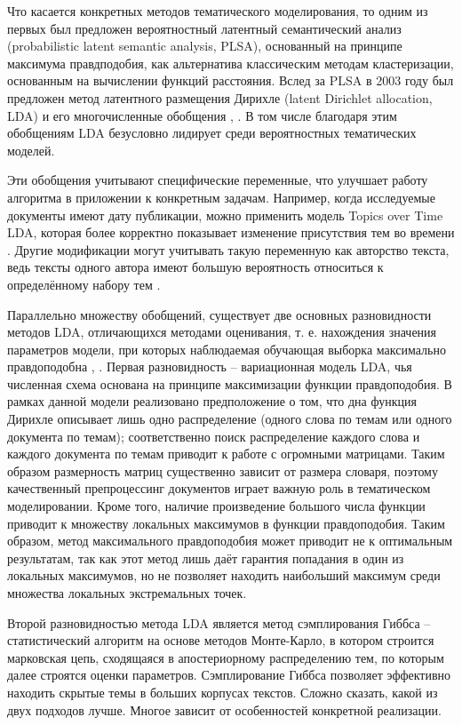 Что касается конкретных методов тематического моделирования, то одним из первых был предложен вероятностный латентный семантический анализ (probabilistic latent semantic analysis, PLSA), основанный на принципе максимума правдподобия, как альтернатива классическим методам кластеризации, основанным на вычислении функций расстояния. Вслед за PLSA в 2003 году был предложен метод латентного размещения Дирихле (latent Dirichlet allocation, LDA) \cite{LDAOrigin} и его многочисленные обобщения \cite{NeedlesInAHaystack}, \cite{LDASurvey}. В том числе благодаря этим обобщениям LDA безусловно лидирует среди вероятностных тематических моделей.

Эти обобщения учитывают специфические переменные, что улучшает работу алгоритма в приложении к конкретным задачам. Например, когда исследуемые документы имеют дату публикации, можно применить модель Topics over Time LDA, которая более корректно показывает изменение присутствия тем во времени \cite{ToTLDA}. Другие модификации могут учитывать такую переменную как авторство текста, ведь тексты одного автора имеют большую вероятность относиться к определённому набору тем \cite{authorLDA}.

Параллельно множеству обобщений, существует две основных разновидности методов LDA, отличающихся методами оценивания, т. е. нахождения значения параметров модели, при которых наблюдаемая обучающая выборка максимально правдоподобна \cite{kolcovaJJ}, \cite[стр. 1]{HoffmanBB10}. Первая разновидность -- вариационная модель LDA, чья численная схема основана на принципе максимизации функции правдоподобия. В рамках данной модели реализовано предположение о том, что дна функция Дирихле описывает лишь одно распределение (одного слова по темам или одного документа по темам); соответственно поиск распределение каждого слова и каждого документа по темам приводит к работе с огромными матрицами. Таким образом размерность матриц существенно зависит от размера словаря, поэтому качественный препроцессинг документов играет важную роль в тематическом моделировании. Кроме того, наличие произведение большого числа функции приводит к множеству локальных максимумов в функции правдоподобия. Таким образом, метод максимального правдоподобия может приводит не к оптимальным результатам, так как этот метод лишь даёт гарантия попадания в один из локальных максимумов, но не позволяет находить наибольший максимум среди множества локальных экстремальных точек.

Второй разновидностью метода LDA является метод сэмплирования Гиббса -- статистический алгоритм на основе методов Монте-Карло, в котором строится марковская цепь, сходящаяся в апостериорному распределению тем, по которым далее строятся оценки параметров. Сэмплирование Гиббса позволяет эффективно находить скрытые темы в больших корпусах текстов. Сложно сказать, какой из двух подходов лучше. Многое зависит от особенностей конкретной реализации.

